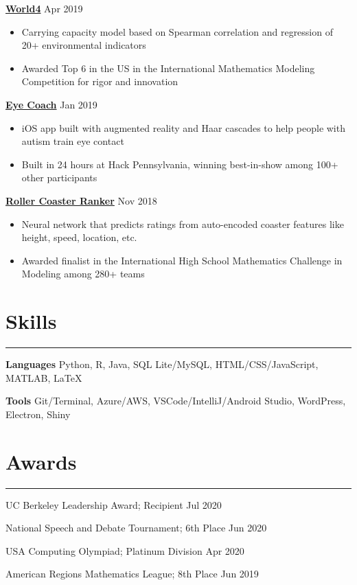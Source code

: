 \documentclass[11pt]{article}
\newcommand{\resumesection}[1]{\vspace{-0.6cm}\section*{\color{highlight}#1}\vspace{-0.3cm}\hrule\vspace{0.2cm}}
\begin{document}
\textbf{\href{https://github.com/gautomdas/IMMC-World4/blob/master/US-9365.pdf}{World4}} \hfill Apr 2019\par
\begin{itemize}
	\item Carrying capacity model based on Spearman correlation and regression of 20+ environmental indicators
	\item Awarded Top 6 in the US in the International Mathematics Modeling Competition for rigor and innovation
\end{itemize}\vspace{0.1cm} \par

\textbf{\href{https://github.com/gautomdas/eye-coach}{Eye Coach}} \hfill Jan 2019 \par
\begin{itemize}
	\item iOS app built with augmented reality and Haar cascades to help people with autism train eye contact
	\item Built in 24 hours at Hack Pennsylvania, winning best-in-show among 100+ other participants
\end{itemize}\vspace{0.1cm} \par

\textbf{\href{https://github.com/prayaggordy/HiMCM}{Roller Coaster Ranker}}  \hfill Nov 2018\par
\begin{itemize}
	\item Neural network that predicts ratings from auto-encoded coaster features like height, speed, location, etc.
	\item Awarded finalist in the International High School Mathematics Challenge in Modeling among 280+ teams
\end{itemize}\par

\resumesection{Skills}

\textbf{Languages} Python, R, Java, SQL Lite/MySQL, HTML/CSS/JavaScript, MATLAB, \LaTeX \par
\textbf{Tools} Git/Terminal, Azure/AWS, VSCode/IntelliJ/Android Studio, WordPress, Electron, Shiny

\resumesection{Awards}

UC Berkeley Leadership Award; Recipient \hfill Jul 2020 \par
National Speech and Debate Tournament; 6th Place \hfill Jun 2020 \par
USA Computing Olympiad; Platinum Division \hfill Apr 2020 \par
American Regions Mathematics League; 8th Place \hfill Jun 2019 \par
\end{document}

